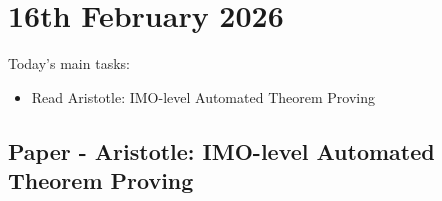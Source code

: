 \documentclass[12pt,a4paper,twoside]{article}
\begin{document}
\section{16th February 2026}

\begin{summary}
	Today's main tasks:
	\begin{itemize}[leftmargin=*]
		\item Read Aristotle: IMO-level Automated Theorem Proving~\cite{Achim2025}
	\end{itemize}
\end{summary}

\subsection{Paper - Aristotle: IMO-level Automated Theorem Proving }
\end{document}
